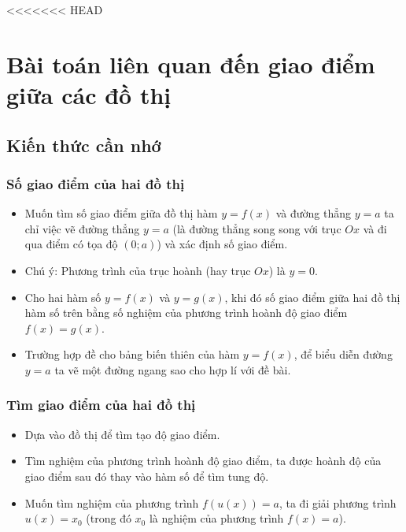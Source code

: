 <<<<<<< HEAD
\setcounter{ex}{0}
\section{Bài toán liên quan đến giao điểm giữa các đồ thị}
\subsection{Kiến thức cần nhớ}
\begin{khung}
	\subsubsection{Số giao điểm của hai đồ thị}
	\begin{itemize}
		\item Muốn tìm số giao điểm giữa đồ thị hàm $y=f(x)$ và đường thẳng $y=a$ ta chỉ việc vẽ đường thẳng $y=a$ (là đường thẳng song song với trục $Ox$ và đi qua điểm có tọa độ $(0;a)$) và xác định số giao điểm.
		\item  Chú ý: Phương trình của trục hoành (hay trục $Ox$) là $y=0$.
		\item Cho hai hàm số $y=f(x)$ và $y=g(x)$, khi đó số giao điểm giữa hai đồ thị hàm số trên bằng số nghiệm của phương trình hoành độ giao điểm $f(x)=g(x)$.
		\item Trường hợp đề cho bảng biến thiên của hàm $y=f(x)$, để biểu diễn đường $y=a$ ta vẽ một đường ngang sao cho hợp lí với đề bài.
			\end{itemize}
			\subsubsection{Tìm giao điểm của hai đồ thị}
			\begin{itemize}
				\item Dựa vào đồ thị để tìm tạo độ giao điểm.\item Tìm nghiệm của phương trình hoành độ giao điểm, ta được hoành độ của giao điểm sau đó thay vào hàm số để tìm tung độ. \item Muốn tìm nghiệm của phương trình $f(u(x))=a$, ta đi giải phương trình $u(x)=x_0$ (trong đó $x_0$ là nghiệm của phương trình $f(x)=a$).
			\end{itemize}
\end{khung}
